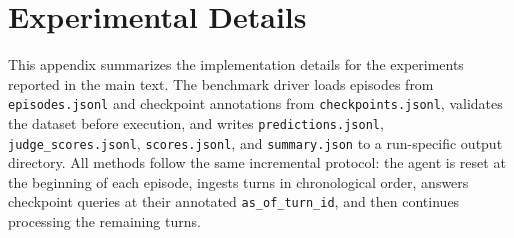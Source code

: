 \section{Experimental Details}
\label{app:experiment-details}

This appendix summarizes the implementation details for the experiments reported in the main text. 
The benchmark driver loads episodes from \texttt{episodes.jsonl} and checkpoint annotations from \texttt{checkpoints.jsonl}, validates the dataset before execution, and writes \texttt{predictions.jsonl}, \texttt{judge\_scores.jsonl}, \texttt{scores.jsonl}, and \texttt{summary.json} to a run-specific output directory. 
All methods follow the same incremental protocol: the agent is reset at the beginning of each episode, ingests turns in chronological order, answers checkpoint queries at their annotated \texttt{as\_of\_turn\_id}, and then continues processing the remaining turns.

